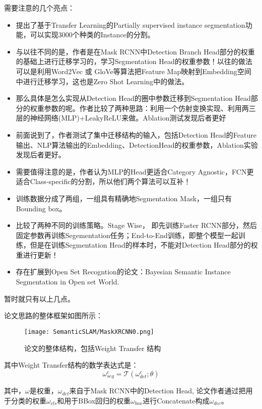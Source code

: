 需要注意的几个亮点：
\begin{itemize}
\item 提出了基于Transfer Learning的Partially supervised instance segmentation功能，可以实现3000个种类的Instance的分割。
\item 与以往不同的是，作者是在Mask RCNN中Detection Branch Head部分的权重的基础上进行迁移学习的，学习Segmentation Head的权重参数！以往的做法可以是利用Word2Vec 或 GloVe等算法把Feature Map映射到Embedding空间中进行迁移学习，这也是Zero Shot Learning中的做法。
\item 那么具体是怎么实现从Detection Head的圈中参数迁移到Segmentation Head部分的权重参数的呢。作者比较了两种思路：利用一个仿射变换实现、利用两三层的神经网络(MLP)+LeakyReLU来做。Ablation测试发现后者更好
\item 前面说到了，作者测试了集中迁移结构的输入，包括Detection Head的Feature 输出、NLP算法输出的Embedding、DetectionHead的权重参数，Ablation实验发现后者更好。
\item 需要值得注意的是，作者认为MLP的Head更适合Category Agnostic，FCN更适合Class-specific的分割，所以他们两个算法可以互补！
\item 训练数据分成了两组，一组具有精确地Segmentation Mask，一组只有Bounding box。
\item 比较了两种不同的训练策略。Stage Wise， 即先训练Faster RCNN部分，然后固定参数再训练Segementation任务；End-to-End训练，即整个模型一起训练，但是在训练Segmentation Head的样本时，不能对Detection Head部分的权重进行更新！
\item 存在扩展到Open Set Recogntion的论文：Bayesian Semantic Instance Segmentation in Open set World.
\end{itemize}

暂时就只有以上几点。

论文思路的整体框架如图所示：
\begin{figure}[!hbtp]
\centering
\texttt{[image: SemanticSLAM/MaskXRCNN0.png]}
\caption{论文的整体结构，包括Weight Transfer 结构}
\label{MaskXRCNN0}
\end{figure}

其中Weight Transfer结构的数学表达式是：
\begin{displaymath}
\omega_{seg}^c = \mathcal{T}(\omega_{det}^c; \theta)
\end{displaymath}

其中，$\omega$是权重，$\omega_{det}$来自于Mask RCNN中的Detection Head, 论文作者通过把用于分类的权重$\omega_{cls}$和用于BBox回归的权重$\omega_{box}$进行Concatenate构成$\omega_{dec}$。

